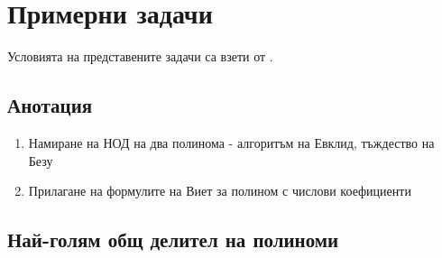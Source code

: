 \documentclass[
  headings=standardclasses,
  bibliography=totocnumbered,
]{scrartcl}
\begin{document}
\section{Примерни задачи}

Условията на представените задачи са взети от \cite{PolynomialExercises}.

\subsection{Анотация}

\begin{enumerate}
  \item Намиране на НОД на два полинома - алгоритъм на Евклид, тъждество на Безу
  \item Прилагане на формулите на Виет за полином с числови коефициенти
\end{enumerate}

\subsection{Най-голям общ делител на полиноми}
\end{document}
